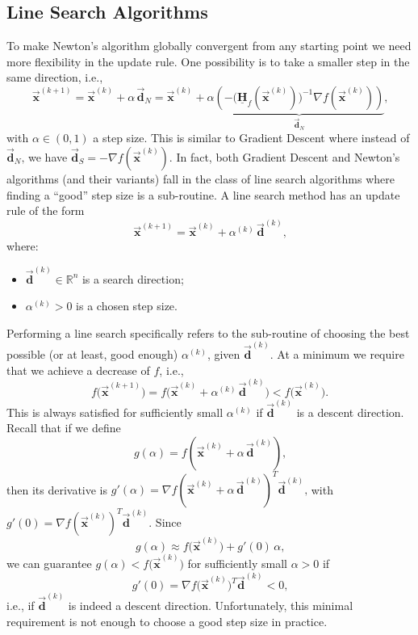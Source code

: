 \documentclass[9pt, headings=standardclasses, parskip=half]{scrartcl}
\renewcommand{\emph}[1]{\textcolor{mypurple}{#1}}
\newcommand{\matr}[1]{\underline{\boldsymbol{#1}}}
\newcommand{\vect}[1]{\vec{\boldsymbol{#1}}}
\begin{document}

\subsection{Line Search Algorithms}

To make Newton's algorithm globally convergent from any starting point we need more flexibility in the update rule. One possibility is to take a smaller step in the same direction, i.e.,
\[
\vect{x}^{(k+1)} = \vect{x}^{(k)} + \alpha\, \vect{d}_{N} = \vect{x}^{(k)} + \alpha 
\underbrace{
\left(-\big(\matr{H}_{f}(\vect{x}^{(k)})\big)^{-1}\nabla f(\vect{x}^{(k)})\right) 
}_{\vect{d}_{N}}
\text{,}
\]
with \(\alpha \in (0,1)\) a step size. This is similar to Gradient Descent where instead of 
\(
\vect{d}_{N} \text{,}
\)
we have
\(
\vect{d}_{S} = -\nabla f(\vect{x}^{(k)}) \text{.}
\)
In fact, both Gradient Descent and Newton's algorithms (and their variants) fall in the class of \emph{line search} algorithms where finding a “good” step size is a sub-routine. A line search method has an update rule of the form
\[
\vect{x}^{(k+1)} = \vect{x}^{(k)} + \alpha^{(k)}\, \vect{d}^{(k)} \text{,}
\]
where:
\begin{itemize}
  \item \(\vect{d}^{(k)} \in \mathbb{R}^n\) is a search direction;
  \item \(\alpha^{(k)} > 0\) is a chosen step size.
\end{itemize}

Performing a line search specifically refers to the sub-routine of choosing the best possible (or at least, good enough) \(\alpha^{(k)}\), given \(\vect{d}^{(k)}\). 
At a minimum we require that we achieve a decrease of \(f\), i.e.,
\[
f\bigl(\vect{x}^{(k+1)}\bigr) = f\bigl(\vect{x}^{(k)} + \alpha^{(k)}\,\vect{d}^{(k)}\bigr) < f\bigl(\vect{x}^{(k)}\bigr) \text{.}
\]
This is always satisfied for sufficiently small \(\alpha^{(k)}\) if \(\vect{d}^{(k)}\) is a descent direction. 
Recall that if we define
\[
g(\alpha) = f(\vect{x}^{(k)} + \alpha\, \vect{d}^{(k)}) \text{,}
\]
then its derivative is
\(
g'(\alpha) = \nabla f(\vect{x}^{(k)} + \alpha\, \vect{d}^{(k)})^T \vect{d}^{(k)} \text{,}
\)
with
\(
g'(0) = \nabla f(\vect{x}^{(k)})^T \vect{d}^{(k)} \text{.}
\)
Since
\[
g(\alpha) \approx f\bigl(\vect{x}^{(k)}\bigr) + g'(0)\,\alpha \text{,}
\]
we can guarantee \(g(\alpha) < f\bigl(\vect{x}^{(k)}\bigr)\) for sufficiently small \(\alpha>0\) if
\[
g'(0) = \nabla f\bigl(\vect{x}^{(k)}\bigr)^T \vect{d}^{(k)} < 0 \text{,}
\]
i.e., if \(\vect{d}^{(k)}\) is indeed a descent direction. Unfortunately, this minimal requirement is not enough to choose a good step size in practice.
\end{document}
